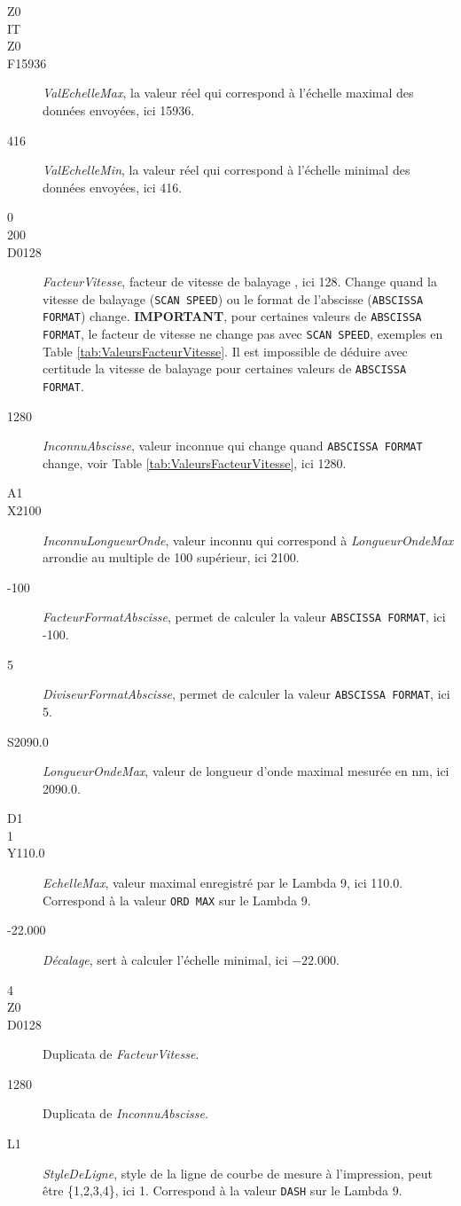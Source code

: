 \documentclass[a4paper, 12pt]{article}
\begin{document}
\begin{description}
	\item[Z0]
	\item[IT]
	\item[Z0]
	\item[F15936] \emph{ValEchelleMax}, la valeur réel qui correspond à l'échelle maximal des données envoyées, ici 15936.
	\item[416] \emph{ValEchelleMin}, la valeur réel qui correspond à l'échelle minimal des données envoyées, ici 416.
	\item[0]
	\item[200]
	\item[D0128]  \emph{FacteurVitesse}, facteur de vitesse de balayage , ici 128.
		Change quand la vitesse de balayage (\verb|SCAN SPEED|) ou le format de l'abscisse (\verb|ABSCISSA FORMAT|) change.
		\textbf{IMPORTANT}, pour certaines valeurs de \verb|ABSCISSA FORMAT|, le facteur de vitesse ne change pas avec \verb|SCAN SPEED|, exemples en Table \ref{tab:ValeursFacteurVitesse}.
		Il est impossible de déduire avec certitude la vitesse de balayage pour certaines valeurs de \verb|ABSCISSA FORMAT|.
	\item[1280] \emph{InconnuAbscisse}, valeur inconnue qui change quand \verb|ABSCISSA FORMAT| change, voir Table \ref{tab:ValeursFacteurVitesse}, ici 1280. 
	\item[A1]
	\item[X2100] \emph{InconnuLongueurOnde}, valeur inconnu qui correspond à \emph{LongueurOndeMax} arrondie au multiple de 100 supérieur, ici 2100.
	\item[-100] \emph{FacteurFormatAbscisse}, permet de calculer la valeur \verb|ABSCISSA FORMAT|, ici -100.
	\item[5] \emph{DiviseurFormatAbscisse}, permet de calculer la valeur \verb|ABSCISSA FORMAT|, ici 5.
	\item[S2090.0] \emph{LongueurOndeMax}, valeur de longueur d'onde maximal mesurée en nm, ici 2090.0.
	\item[D1]
	\item[1]
	\item[Y110.0] \emph{EchelleMax}, valeur maximal enregistré par le Lambda 9, ici 110.0.
		Correspond à la valeur \verb|ORD MAX| sur le Lambda 9.
	\item[-22.000] \emph{Décalage}, sert à calculer l'échelle minimal, ici $-22.000$.
	\item[4]
	\item[Z0]
	\item[D0128] Duplicata de \emph{FacteurVitesse}.
	\item[1280] Duplicata de \emph{InconnuAbscisse}.
	\item[L1] \emph{StyleDeLigne}, style de la ligne de courbe de mesure à l'impression, peut être \{1,2,3,4\}, ici 1.
		Correspond à la valeur \verb|DASH| sur le Lambda 9.\\

\end{description}
\end{document}
